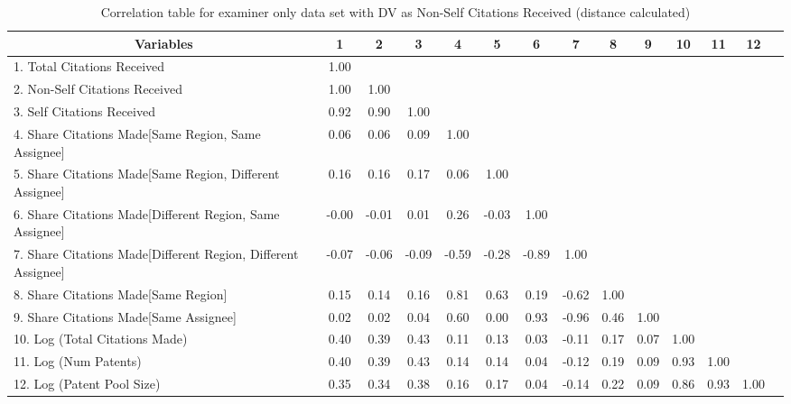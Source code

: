 \begin{table}[htbp]\centering \caption{Correlation table for examiner only data set with DV as Non-Self Citations Received (distance calculated)\label{e.ncorrelation}}
\footnotesize
\singlespacing
\begin{adjustbox}{angle=90}
\begin{tabular}{l  c  c  c  c  c  c  c  c  c  c  c  c  c }\hline\hline
\multicolumn{1}{c}{Variables} &1&2&3&4&5&6&7&8&9&10&11&12\\ \hline
1. Total Citations Received&1.00\\
2. Non-Self Citations Received&1.00&1.00\\
3. Self Citations Received&0.92&0.90&1.00\\
4. Share Citations Made[Same Region, Same Assignee]&0.06&0.06&0.09&1.00\\
5. Share Citations Made[Same Region, Different Assignee]&0.16&0.16&0.17&0.06&1.00\\
6. Share Citations Made[Different Region, Same Assignee]&-0.00&-0.01&0.01&0.26&-0.03&1.00\\
7. Share Citations Made[Different Region, Different Assignee]&-0.07&-0.06&-0.09&-0.59&-0.28&-0.89&1.00\\
8. Share Citations Made[Same Region]&0.15&0.14&0.16&0.81&0.63&0.19&-0.62&1.00\\
9. Share Citations Made[Same Assignee]&0.02&0.02&0.04&0.60&0.00&0.93&-0.96&0.46&1.00\\
10. Log (Total Citations Made)&0.40&0.39&0.43&0.11&0.13&0.03&-0.11&0.17&0.07&1.00\\
11. Log (Num Patents)&0.40&0.39&0.43&0.14&0.14&0.04&-0.12&0.19&0.09&0.93&1.00\\
12. Log (Patent Pool Size)&0.35&0.34&0.38&0.16&0.17&0.04&-0.14&0.22&0.09&0.86&0.93&1.00\\
\hline \hline 
 \end{tabular}
 \end{adjustbox}
\end{table}
